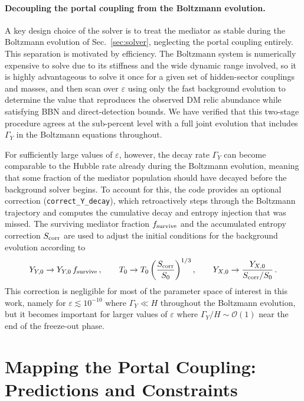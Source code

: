 \documentclass[11pt]{article}
\numberwithin{equation}{section}
\begin{document}
\paragraph{Decoupling the portal coupling from the Boltzmann evolution.}
A key design choice of the solver is to treat the mediator as stable during the Boltzmann evolution of Sec.~\ref{sec:solver}, neglecting the portal coupling entirely. This separation is motivated by efficiency. The Boltzmann system is numerically expensive to solve due to its stiffness and the wide dynamic range involved, so it is highly advantageous to solve it once for a given set of hidden-sector couplings and masses, and then scan over $\varepsilon$ using only the fast background evolution to determine the value that reproduces the observed DM relic abundance while satisfying BBN and direct-detection bounds. We have verified that this two-stage procedure agrees at the sub-percent level with a full joint evolution that includes $\Gamma_Y$ in the Boltzmann equations throughout.
 
For sufficiently large values of $\varepsilon$, however, the decay rate $\Gamma_Y$ can become comparable to the Hubble rate already during the Boltzmann evolution, meaning that some fraction of the mediator population should have decayed before the background solver begins. To account for this, the code provides an optional correction (\texttt{correct\_Y\_decay}), which retroactively steps through the Boltzmann trajectory and computes the cumulative decay and entropy injection that was missed. The surviving mediator fraction $f_{\rm survive}$ and the accumulated entropy correction $S_{\rm corr}$ are used to adjust the initial conditions for the background evolution according to
\begin{equation}
  Y_{Y,0} \to Y_{Y,0}\,f_{\rm survive}\,,\qquad
  T_0 \to T_0\left(\frac{S_{\rm corr}}{S_0}\right)^{1/3},\qquad
  Y_{X,0} \to \frac{Y_{X,0}}{S_{\rm corr}/S_0}\,.
  \label{eq:Ydecay_correction}
\end{equation}
This correction is negligible for most of the parameter space of interest in this work, namely for $\varepsilon \lesssim 10^{-10}$ where $\Gamma_Y \ll H$ throughout the Boltzmann evolution, but it becomes important for larger values of $\varepsilon$ where $\Gamma_Y/H \sim \mathcal{O}(1)$ near the end of the freeze-out phase.


\section{Mapping the Portal Coupling: Predictions and Constraints}
\label{sec:mapping}
\end{document}
